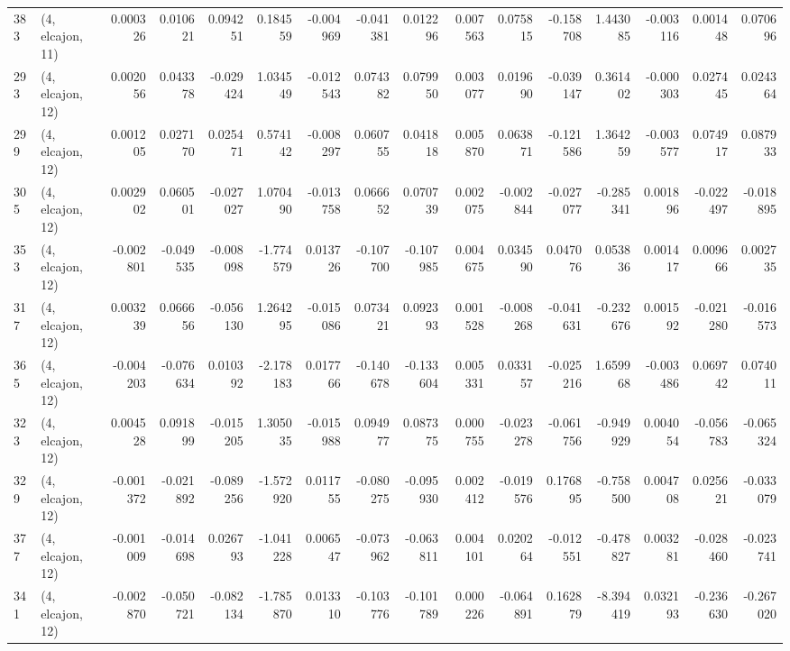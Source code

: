 \begin{tabular}{llrrrrrrrrrrrrrr}
383 &  (4, elcajon, 11) &   0.000326 &  0.010621 &  0.094251 &   0.184559 & -0.004969 &  -0.041381 &  0.012296 &  0.007563 &  0.075815 & -0.158708 &     1.443085 &  -0.003116 &   0.001448 &   0.070696 \\
293 &  (4, elcajon, 12) &   0.002056 &  0.043378 & -0.029424 &   1.034549 & -0.012543 &   0.074382 &  0.079950 &  0.003077 &  0.019690 & -0.039147 &     0.361402 &  -0.000303 &   0.027445 &   0.024364 \\
299 &  (4, elcajon, 12) &   0.001205 &  0.027170 &  0.025471 &   0.574142 & -0.008297 &   0.060755 &  0.041818 &  0.005870 &  0.063871 & -0.121586 &     1.364259 &  -0.003577 &   0.074917 &   0.087933 \\
305 &  (4, elcajon, 12) &   0.002902 &  0.060501 & -0.027027 &   1.070490 & -0.013758 &   0.066652 &  0.070739 &  0.002075 & -0.002844 & -0.027077 &    -0.285341 &   0.001896 &  -0.022497 &  -0.018895 \\
353 &  (4, elcajon, 12) &  -0.002801 & -0.049535 & -0.008098 &  -1.774579 &  0.013726 &  -0.107700 & -0.107985 &  0.004675 &  0.034590 &  0.047076 &     0.053836 &   0.001417 &   0.009666 &   0.002735 \\
317 &  (4, elcajon, 12) &   0.003239 &  0.066656 & -0.056130 &   1.264295 & -0.015086 &   0.073421 &  0.092393 &  0.001528 & -0.008268 & -0.041631 &    -0.232676 &   0.001592 &  -0.021280 &  -0.016573 \\
365 &  (4, elcajon, 12) &  -0.004203 & -0.076634 &  0.010392 &  -2.178183 &  0.017766 &  -0.140678 & -0.133604 &  0.005331 &  0.033157 & -0.025216 &     1.659968 &  -0.003486 &   0.069742 &   0.074011 \\
323 &  (4, elcajon, 12) &   0.004528 &  0.091899 & -0.015205 &   1.305035 & -0.015988 &   0.094977 &  0.087375 &  0.000755 & -0.023278 & -0.061756 &    -0.949929 &   0.004054 &  -0.056783 &  -0.065324 \\
329 &  (4, elcajon, 12) &  -0.001372 & -0.021892 & -0.089256 &  -1.572920 &  0.011755 &  -0.080275 & -0.095930 &  0.002412 & -0.019576 &  0.176895 &    -0.758500 &   0.004708 &   0.025621 &  -0.033079 \\
377 &  (4, elcajon, 12) &  -0.001009 & -0.014698 &  0.026793 &  -1.041228 &  0.006547 &  -0.073962 & -0.063811 &  0.004101 &  0.020264 & -0.012551 &    -0.478827 &   0.003281 &  -0.028460 &  -0.023741 \\
341 &  (4, elcajon, 12) &  -0.002870 & -0.050721 & -0.082134 &  -1.785870 &  0.013310 &  -0.103776 & -0.101789 &  0.000226 & -0.064891 &  0.162879 &    -8.394419 &   0.032193 &  -0.236630 &  -0.267020 \\

\end{tabular}
